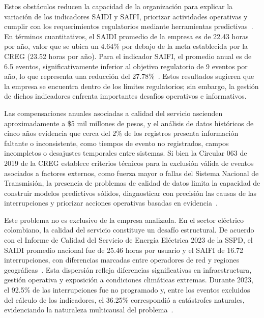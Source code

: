 Estos obstáculos reducen la capacidad de la organización para explicar la variación de los indicadores SAIDI y SAIFI, priorizar actividades operativas y cumplir con los requerimientos regulatorios mediante herramientas predictivas~\cite{ref3,ref8}. En términos cuantitativos, el SAIDI promedio de la empresa es de 22.43 horas por año, valor que se ubica un 4.64\% por debajo de la meta establecida por la CREG (23.52 horas por año). Para el indicador SAIFI, el promedio anual es de 6.5 eventos, significativamente inferior al objetivo regulatorio de 9 eventos por año, lo que representa una reducción del 27.78\%~\cite{ref1}. Estos resultados sugieren que la empresa se encuentra dentro de los límites regulatorios; sin embargo, la gestión de dichos indicadores enfrenta importantes desafíos operativos e informativos.

Las compensaciones anuales asociadas a calidad del servicio ascienden aproximadamente a \$5 mil millones de pesos, y el análisis de datos históricos de cinco años evidencia que cerca del 2\% de los registros presenta información faltante o inconsistente, como tiempos de evento no registrados, campos incompletos o desajustes temporales entre sistemas. Si bien la Circular 063 de 2019 de la CREG establece criterios técnicos para la exclusión válida de eventos asociados a factores externos, como fuerza mayor o fallas del Sistema Nacional de Transmisión, la presencia de problemas de calidad de datos limita la capacidad de construir modelos predictivos sólidos, diagnosticar con precisión las causas de las interrupciones y priorizar acciones operativas basadas en evidencia~\cite{ref1,ref4,ref3,ref44}.

Este problema no es exclusivo de la empresa analizada. En el sector eléctrico colombiano, la calidad del servicio constituye un desafío estructural. De acuerdo con el Informe de Calidad del Servicio de Energía Eléctrica 2023 de la SSPD, el SAIDI promedio nacional fue de 25.46 horas por usuario y el SAIFI de 16.72 interrupciones, con diferencias marcadas entre operadores de red y regiones geográficas~\cite[pp.~20--21, 37]{ref46}. Esta dispersión refleja diferencias significativas en infraestructura, gestión operativa y exposición a condiciones climáticas extremas. Durante 2023, el 92.5\% de las interrupciones fue no programado y, entre los eventos excluidos del cálculo de los indicadores, el 36.25\% correspondió a catástrofes naturales, evidenciando la naturaleza multicausal del problema~\cite[pp.~13--14]{ref46}.


